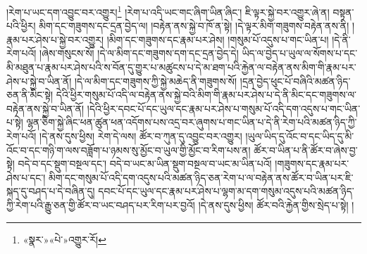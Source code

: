 །རེག་པ་ཡང་དག་འབྱུང་བར་འགྱུར།\footnote{«སྣར་»«པེ་»འགྱུར་རོ།} །རེག་པ་འདི་ཡང་གང་ཞིག་ཡིན་ཞིང་། ཇི་ལྟར་སྐྱེ་བར་འགྱུར་ཞེ་ན། བསྟན་པའི་ཕྱིར། མིག་དང་གཟུགས་དང་དྲན་བྱེད་ལ། །བརྟེན་ནས་སྐྱེ་བ་ཁོ་ན་སྟེ། །དེ་ལྟར་མིག་གཟུགས་བརྟེན་ནས་ནི། །རྣམ་པར་ཤེས་པ་སྐྱེ་བར་འགྱུར། །མིག་དང་གཟུགས་དང་རྣམ་པར་ཤེས། །གསུམ་པོ་འདུས་པ་གང་ཡིན་པ། །དེ་ནི་རེག་པའོ། །ཞེས་གསུངས་སོ། །དེ་ལ་མིག་དང་གཟུགས་དག་དང་དྲན་བྱེད་དེ། ཡིད་ལ་བྱེད་པ་ཡུལ་ལ་སོགས་པ་དང་མི་མཐུན་པ་རྣམ་པར་ཤེས་པའི་ས་བོན་དུ་གྱུར་པ་མཚུངས་པ་དེ་མ་ཐག་པའི་རྐྱེན་ལ་བརྟེན་ནས་མིག་གི་རྣམ་པར་ཤེས་པ་སྐྱེ་བ་ཡིན་ནོ། །དེ་ལ་མིག་དང་གཟུགས་ཀྱི་སྐྱེ་མཆེད་ནི་གཟུགས་སོ། །དྲན་བྱེད་ཕུང་པོ་བཞིའི་མཚན་ཉིད་ཅན་ནི་མིང་སྟེ། དེའི་ཕྱིར་གསུམ་པོ་འདི་ལ་བརྟེན་ནས་སྐྱེ་བའི་མིག་གི་རྣམ་པར་ཤེས་པ་དེ་ནི་མིང་དང་གཟུགས་ལ་བརྟེན་ནས་སྐྱེ་བ་ཡིན་ནོ། །དེའི་ཕྱིར་དབང་པོ་དང་ཡུལ་དང་རྣམ་པར་ཤེས་པ་གསུམ་པོ་འདི་དག་འདུས་པ་གང་ཡིན་པ་སྟེ། ལྷན་ཅིག་སྐྱེ་ཞིང་ཕན་ཚུན་ཕན་འདོགས་པས་འདྲ་བར་ཞུགས་པ་གང་ཡིན་པ་དེ་ནི་རེག་པའི་མཚན་ཉིད་ཀྱི་རེག་པའོ། །དེ་ནས་དུས་ཕྱིས། རེག་དེ་ལས། ཚོར་བ་ཀུན་དུ་འབྱུང་བར་འགྱུར། །ཡུལ་ཡིད་དུ་འོང་བ་དང་ཡིད་དུ་མི་འོང་བ་དང་གཉི་ག་ལས་བཟློག་པ་ཉམས་སུ་མྱོང་བ་ཡུལ་གྱི་མྱོང་བ་རིག་པས་ན། ཚོར་བ་ཡིན་པ་ནི་ཚོར་བ་ཞེས་བྱ་སྟེ། བདེ་བ་དང་སྡུག་བསྔལ་དང་། བདེ་བ་ཡང་མ་ཡིན་སྡུག་བསྔལ་བ་ཡང་མ་ཡིན་པའོ། །གཟུགས་དང་རྣམ་པར་ཤེས་པ་དང་། མིག་དང་གསུམ་པོ་འདི་དག་འདུས་པའི་མཚན་ཉིད་ཅན་རེག་པ་ལ་བརྟེན་ནས་ཚོར་བ་ཡིན་པར་ཇི་སྐད་དུ་བཤད་པ་དེ་བཞིན་དུ། དབང་པོ་དང་ཡུལ་དང་རྣམ་པར་ཤེས་པ་ལྷག་མ་དག་གསུམ་འདུས་པའི་མཚན་ཉིད་ཀྱི་རེག་པའི་རྒྱུ་ཅན་གྱི་ཚོར་བ་ཡང་བཤད་པར་རིག་པར་བྱའོ། །དེ་ནས་དུས་ཕྱིས། ཚོར་བའི་རྐྱེན་གྱིས་སྲེད་པ་སྟེ། །
